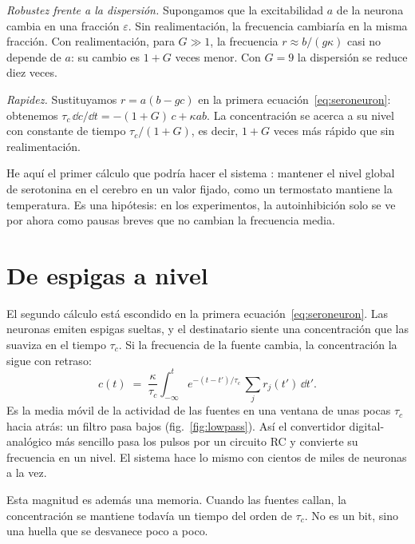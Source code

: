 \emph{Robustez frente a la dispersión.} Supongamos que la excitabilidad $a$ de la neurona cambia en una fracción $\varepsilon$. Sin realimentación, la frecuencia cambiaría en la misma fracción. Con realimentación, para $G\gg1$, la frecuencia $r\approx b/(g\kappa)$ casi no depende de $a$: su cambio es $1+G$ veces menor. Con $G=9$ la dispersión se reduce diez veces.

\emph{Rapidez.} Sustituyamos $r=a(b-gc)$ en la primera ecuación~\eqref{eq:seroneuron}: obtenemos $\tau_c\,\dd c/\dd t=-(1+G)\,c+\kappa ab$. La concentración se acerca a su nivel con constante de tiempo $\tau_c/(1+G)$, es decir, $1+G$ veces más rápido que sin realimentación.

He aquí el primer cálculo que podría hacer el sistema : mantener el nivel global de serotonina en el cerebro en un valor fijado, como un termostato mantiene la temperatura. Es una hipótesis: en los experimentos, la autoinhibición solo se ve por ahora como pausas breves que no cambian la frecuencia media.

\section{De espigas a nivel}

El segundo cálculo está escondido en la primera ecuación~\eqref{eq:seroneuron}. Las neuronas emiten espigas sueltas, y el destinatario siente una concentración que las suaviza en el tiempo $\tau_c$. Si la frecuencia de la fuente cambia, la concentración la sigue con retraso:
\begin{equation}
c(t) \;=\; \frac{\kappa}{\tau_c}\int_{-\infty}^{t} e^{-(t-t')/\tau_c}\,\sum_j r_j(t')\,\dd t' .
\label{eq:lowpass}
\end{equation}
Es la media móvil de la actividad de las fuentes en una ventana de unas pocas $\tau_c$ hacia atrás: un filtro pasa bajos (fig.~\ref{fig:lowpass}). Así el convertidor digital-analógico más sencillo pasa los pulsos por un circuito RC y convierte su frecuencia en un nivel. El sistema  hace lo mismo con cientos de miles de neuronas a la vez.

Esta magnitud es además una memoria. Cuando las fuentes callan, la concentración se mantiene todavía un tiempo del orden de $\tau_c$. No es un bit, sino una huella que se desvanece poco a poco.

